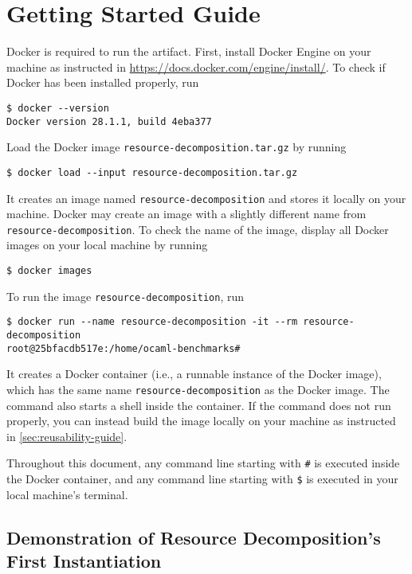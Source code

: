 
\section{Getting Started Guide}

Docker is required to run the artifact.
%
First, install Docker Engine on your machine as instructed in
\url{https://docs.docker.com/engine/install/}.
%
To check if Docker has been installed properly, run
\begin{verbatim}
$ docker --version
Docker version 28.1.1, build 4eba377
\end{verbatim}

Load the Docker image \texttt{resource-decomposition.tar.gz} by running
\begin{verbatim}
$ docker load --input resource-decomposition.tar.gz
\end{verbatim}
%
It creates an image named \texttt{resource-decomposition} and stores it locally
on your machine.
%
Docker may create an image with a slightly different name from
\texttt{resource-decomposition}.
%
To check the name of the image, display all Docker images on your local machine
by running
\begin{verbatim}
$ docker images
\end{verbatim}

To run the image \texttt{resource-decomposition}, run
\begin{verbatim}
$ docker run --name resource-decomposition -it --rm resource-decomposition
root@25bfacdb517e:/home/ocaml-benchmarks#
\end{verbatim}
%
It creates a Docker container (i.e., a runnable instance of the Docker image),
which has the same name \texttt{resource-decomposition} as the Docker image.
%
The command also starts a shell inside the container.
%
If the command does not run properly, you can instead build the image locally on
your machine as instructed in \cref{sec:reusability-guide}.

Throughout this document, any command line starting with \texttt{\#} is executed
inside the Docker container, and any command line starting with \texttt{\$} is
executed in your local machine's terminal.

\subsection{Demonstration of Resource Decomposition's First Instantiation}

